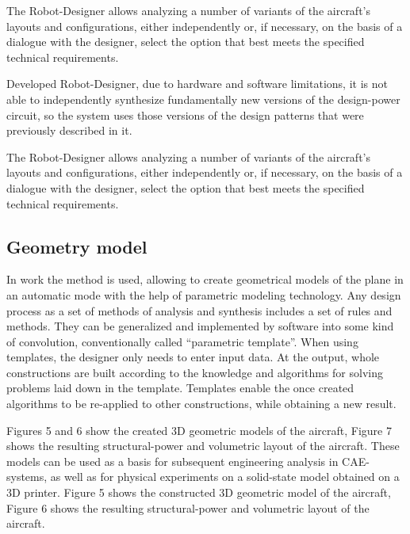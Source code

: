 \documentclass[8pt,twocolumn]{article}
\begin{document}
The Robot-Designer allows analyzing a number of variants of the aircraft’s layouts and configurations, either independently or, if necessary, on the basis of a dialogue with the designer, select the option that best meets the specified technical requirements.

Developed Robot-Designer, due to hardware and software limitations, it is not able to independently synthesize fundamentally new versions of the design-power circuit, so the system uses those versions of the design patterns that were previously described in it.

The Robot-Designer allows analyzing a number of variants of the aircraft’s layouts and configurations, either independently or, if necessary, on the basis of a dialogue with the designer, select the option that best meets the specified technical requirements.
\subsection{Geometry model}
In work the method is used, allowing to create geometrical models of the plane in an automatic mode with the help of parametric modeling technology. Any design process as a set of methods of analysis and synthesis includes a set of rules and methods. They can be generalized and implemented by software into some kind of convolution, conventionally called “parametric template”. When using templates, the designer only needs to enter input data. At the output, whole constructions are built according to the knowledge and algorithms for solving problems laid down in the template. Templates enable the once created algorithms to be re-applied to other constructions, while obtaining a new result.

Figures 5 and 6 show the created 3D geometric models of the aircraft, Figure 7 shows the resulting structural-power and volumetric layout of the aircraft. These models can be used as a basis for subsequent engineering analysis in CAE-systems, as well as for physical experiments on a solid-state model obtained on a 3D printer. Figure 5 shows the constructed 3D geometric model of
the aircraft, Figure 6 shows the resulting structural-power and volumetric layout of the aircraft.
\end{document}
